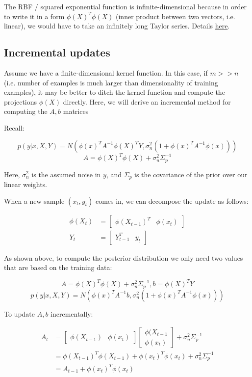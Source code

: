 \documentclass[a4paper]{article}
\begin{document}
The RBF / squared exponential function is infinite-dimensional because in order to write it in a form $\phi(X)^T \phi(X)$ (inner product between two vectors, i.e. linear), we would have to take an infinitely long Taylor series. Details \href{https://math.stackexchange.com/questions/1606110/what-is-an-example-of-a-svm-kernel-where-one-implicitly-uses-an-infinity-dimens/1620256#1620256}{here}.

\subsection{Incremental updates}

Assume we have a finite-dimensional kernel function. In this case, if $m>>n$ (i.e. number of examples is much larger than dimensionality of training examples), it may be better to ditch the kernel function and compute the projections $\phi(X)$ directly. Here, we will derive an incremental method for computing the $A,b$ matrices

Recall:

$$p(y | x, X, Y) = N(\phi(x)^T A^{-1} \phi(X)^T Y, \sigma_n^2 (1 +\phi(x)^T A^{-1} \phi(x)))$$
$$A = \phi(X)^T \phi(X) + \sigma_n^2 \Sigma_p^{-1}$$

Here, $\sigma_n^2$ is the assumed noise in $y$, and $\Sigma_p$ is the covariance of the prior over our linear weights.

When a new sample $(x_t, y_t)$ comes in, we can decompose the update as follows:

\begin{align*}
\phi(X_t) &= \begin{bmatrix}\phi(X_{t-1})^T & \phi(x_t) \end{bmatrix} \\
Y_t &= \begin{bmatrix}Y_{t-1}^T & y_t \end{bmatrix}
\end{align*}

As shown above, to compute the posterior distribution we only need two values that are based on the training data:

$$A = \phi(X)^T \phi(X) + \sigma_n^2 \Sigma_p^{-1}, b = \phi(X)^T Y$$
$$p(y | x, X, Y) = N(\phi(x)^T A^{-1} b, \sigma_n^2 (1 +\phi(x)^T A^{-1} \phi(x)))$$

To update $A,b$ incrementally:

\begin{align*}
A_t &= \begin{bmatrix} \phi(X_{t-1}) & \phi(x_t) \end{bmatrix} \begin{bmatrix} \phi(X_{t-1} \\ \phi(x_t) \end{bmatrix} + \sigma_n^2 \Sigma_p^{-1} \\
&= \phi(X_{t-1})^T\phi(X_{t-1}) + \phi(x_t)^T \phi(x_t) + \sigma_n^2 \Sigma_p^{-1} \\
&= A_{t-1} + \phi(x_t)^T \phi(x_t)
\end{align*}
\end{document}

